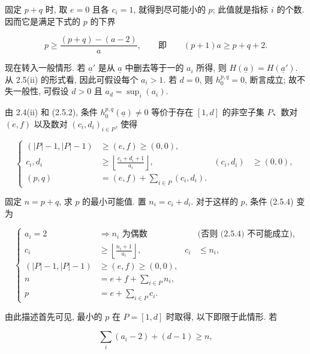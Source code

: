 
固定 $p+q$ 时, 取 $e=0$ 且各 $c_i=1$, 就得到尽可能小的 $p$; 此值就是指标 $i$ 的个数. 因而它是满足下式的 $p$ 的下界

\begin{equation*}
p\geq\frac{(p+q)-(a-2)}{a},
\qquad\text{即}\qquad (p+1)a\geq p+q+2.
\end{equation*}

现在转入一般情形. 若 $\underline a'$ 是从 $\underline a$ 中删去等于一的 $a_i$ 所得, 则 $H(\underline a)=H(\underline a')$. 从 2.5(ii) 的形式看, 因此可假设每个 $a_i>1$. 若 $d=0$, 则 $h_0^{p,q}=0$, 断言成立; 故不失一般性, 可假设 $d>0$ 且 $a_d=\sup_i(a_i)$.

由 2.4(ii) 和 (2.5.2), 条件 $h_0^{p,q}(\underline a)\ne0$ 等价于存在 $[1,d]$ 的非空子集 $P$、数对 $(e,f)$ 以及数对 $(c_i,d_i)_{i\in P}$, 使得

\begin{equation}\tag{2.5.4}
\left\{
\begin{aligned}
(|P|-1,|P|-1)&\geq(e,f)\geq(0,0),\\
c_i,d_i&\geq
\left\lfloor\frac{c_i+d_i+1}{a_i}\right\rfloor,
& (c_i,d_i)&\geq(0,0),\\
(p,q)&=(e,f)+\sum_{i\in P}(c_i,d_i).&&
\end{aligned}
\right.
\end{equation}

固定 $n=p+q$, 求 $p$ 的最小可能值. 置 $n_i=c_i+d_i$. 对于这样的 $p$, 条件 (2.5.4) 变为


\begin{equation}\tag{2.5.5}
\left\{
\begin{aligned}
a_i=2&\Longrightarrow n_i\text{ 为偶数}
&&\text{(否则 (2.5.4) 不可能成立)},\\
c_i&\geq\left\lfloor\frac{n_i+1}{a_i}\right\rfloor,
&c_i&\leq n_i,\\
(|P|-1,|P|-1)&\geq(e,f)\geq(0,0),&&\\
n&=e+f+\sum_{i\in P}n_i,&&\\
p&=e+\sum_{i\in P}c_i.&&
\end{aligned}
\right.
\end{equation}

由此描述首先可见, 最小的 $p$ 在 $P=[1,d]$ 时取得, 以下即限于此情形. 若

\begin{equation}\tag{2.5.6}
\sum_i(a_i-2)+(d-1)\geq n,
\end{equation}

